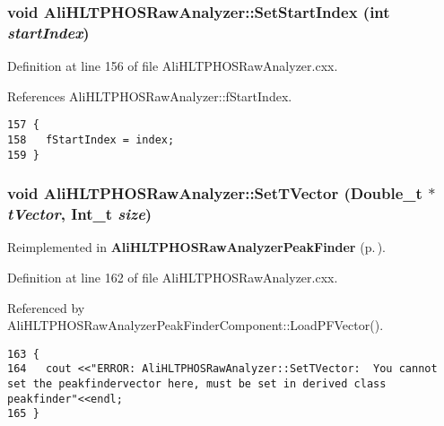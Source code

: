 \subsubsection{\setlength{\rightskip}{0pt plus 5cm}void Ali\-HLTPHOSRaw\-Analyzer::Set\-Start\-Index (int {\em start\-Index})\hspace{0.3cm}{\tt  [inherited]}}\label{classAliHLTPHOSRawAnalyzer_AliHLTPHOSRawAnalyzerPeakFindera14}




Definition at line 156 of file Ali\-HLTPHOSRaw\-Analyzer.cxx.

References Ali\-HLTPHOSRaw\-Analyzer::f\-Start\-Index.

\footnotesize\begin{verbatim}157 {
158   fStartIndex = index;
159 }
\end{verbatim}\normalsize 


\subsubsection{\setlength{\rightskip}{0pt plus 5cm}void Ali\-HLTPHOSRaw\-Analyzer::Set\-TVector (Double\_\-t $\ast$ {\em t\-Vector}, Int\_\-t {\em size})\hspace{0.3cm}{\tt  [virtual, inherited]}}\label{classAliHLTPHOSRawAnalyzer_AliHLTPHOSRawAnalyzerLMSa16}




Reimplemented in {\bf Ali\-HLTPHOSRaw\-Analyzer\-Peak\-Finder} {\rm (p.\,\pageref{classAliHLTPHOSRawAnalyzerPeakFinder_AliHLTPHOSRawAnalyzerPeakFindera4})}.

Definition at line 162 of file Ali\-HLTPHOSRaw\-Analyzer.cxx.

Referenced by Ali\-HLTPHOSRaw\-Analyzer\-Peak\-Finder\-Component::Load\-PFVector().

\footnotesize\begin{verbatim}163 {
164   cout <<"ERROR: AliHLTPHOSRawAnalyzer::SetTVector:  You cannot set the peakfindervector here, must be set in derived class peakfinder"<<endl;
165 }
\end{verbatim}\normalsize 




